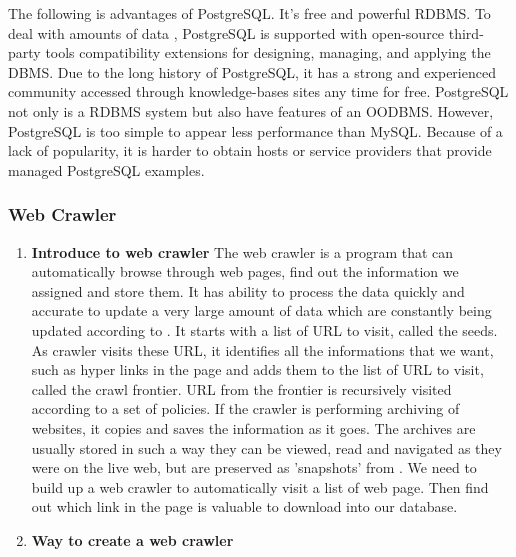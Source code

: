 The following is advantages of PostgreSQL.
It's free and powerful RDBMS.
To deal with amounts of data , PostgreSQL is supported with  open-source third-party tools compatibility extensions for designing, managing, and applying the DBMS.
Due to the long history of PostgreSQL, it has a strong and experienced community accessed through knowledge-bases sites any time for free.
PostgreSQL not only is a RDBMS system but also have features of an OODBMS.
However, PostgreSQL is too simple to appear less performance than MySQL.
Because of a lack of popularity, it is harder to obtain hosts or service providers that provide managed PostgreSQL examples.

\subsubsection{Web Crawler}
\begin{enumerate}
	
	\item\textbf{Introduce to web crawler}
	\setlength{\parindent}{1em}	
	The web crawler is a program that can automatically browse through web pages, find out the information we assigned and store them.
	It has ability to process the data quickly and accurate to update a very large amount of data which are constantly being updated according to \cite{Liu2012}.
	It starts with a list of URL to visit, called the seeds.
	As crawler visits these URL, it identifies all the informations that we want, such as hyper links in the page and adds them to the list of URL to visit, called the crawl frontier.
	URL from the frontier is recursively visited according to a set of policies.
	If the crawler is performing archiving of websites, it copies and saves the information as it goes.
	The archives are usually stored in such a way they can be viewed, read and navigated as they were on the live web, but are preserved as 'snapshots' from \cite{Du2013}.
	We need to build up a web crawler to automatically visit a list of web page.
	Then find out which link in the page is valuable to download into our database.
	
	\item\textbf{Way to create a web crawler}
	\setlength{\parindent}{1em}	
	
\end{enumerate}

